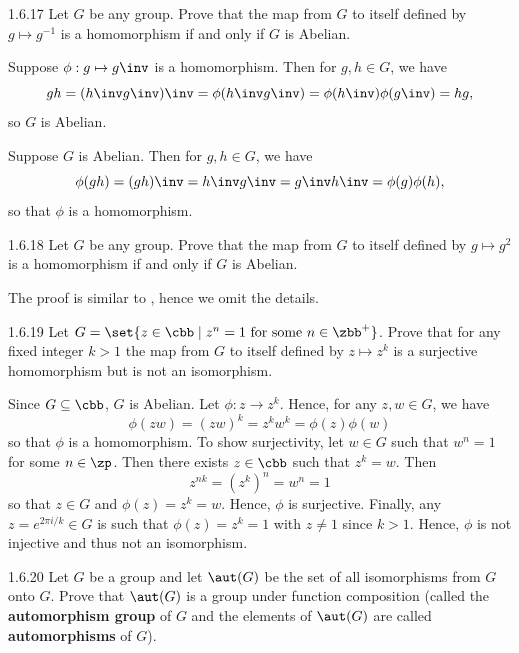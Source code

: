 \begin{exercise}{1.6.17}
    Let $G$ be any group.
	Prove that the map from $G$ to itself defined by $g \mapsto g^{-1}$ is a homomorphism if and only if $G$ is Abelian.
\end{exercise}

\begin{soliff}
    \rightimp Suppose $\phi : g \mapsto g\inv$ is a homomorphism.
	Then for $g, h \in G$, we have
    \[
        gh = (h\inv g\inv)\inv = \phi(h\inv g\inv) = \phi(h\inv)\phi(g\inv) = hg,
    \]
    so $G$ is Abelian.
    
    \leftimp Suppose $G$ is Abelian.
	Then for $g, h \in G$, we have
    \[
    	\phi(gh) = (gh)\inv = h\inv g\inv = g\inv h\inv = \phi(g)\phi(h),
    \]
    so that $\phi$ is a homomorphism.
\end{soliff}

\begin{exercise}{1.6.18}
    Let $G$ be any group.
	Prove that the map from $G$ to itself defined by $g \mapsto g^2$ is a homomorphism if and only if $G$ is Abelian.
\end{exercise}

\begin{sol}
    The proof is similar to , hence we omit the details.
\end{sol}

\begin{exercise}{1.6.19}
    Let $G = \set{ z \in \cbb\mid z^n = 1 \text{ for some } n \in \zbb^+ }$.
	Prove that for any fixed integer $k > 1$ the map from $G$ to itself defined by $z \mapsto z^k$ is a surjective homomorphism but is not an isomorphism.
\end{exercise}

\begin{sol}
    Since $G \subseteq \cbb$, $G$ is Abelian.
	Let $\phi : z \to z^k$.
	Hence, for any $z, w \in G$, we have
    \[
    	\phi(zw) = (zw)^k = z^kw^k = \phi(z)\phi(w)
    \]
    so that $\phi$ is a homomorphism.
	To show surjectivity, let $w \in G$ such that $w^n = 1$ for some $n \in \zp$.
	Then there exists $z \in \cbb$ such that $z^k = w$.
    Then
    \[
        z^{nk} = (z^k)^n = w^n = 1
    \]
    so that $z \in G$ and $\phi(z) = z^k = w$. Hence, $\phi$ is surjective.
	Finally, any $z = e^{2\pi i/k} \in G$ is such that $\phi(z) = z^k = 1$ with $z \neq 1$ since $k > 1$.
	Hence, $\phi$ is not injective and thus not an isomorphism.
\end{sol}

\begin{spex}{1.6.20}
    Let $G$ be a group and let $\aut(G)$ be the set of all isomorphisms from $G$ onto $G$.
	Prove that $\aut(G)$ is a group under function composition (called the \textbf{automorphism group} of $G$ and the elements of $\aut(G)$ are called \textbf{automorphisms} of $G$).
\end{spex}

